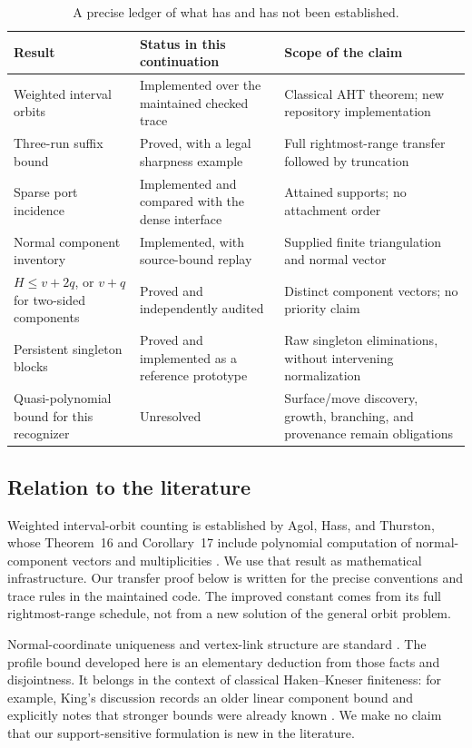 \documentclass[11pt,a4paper]{article}
\theoremstyle{definition}
\theoremstyle{remark}
\begin{document}
\begin{table}[htbp]
\centering\small
\begin{tabularx}{\textwidth}{@{}>{\raggedright\arraybackslash}p{}YY@{}}
\toprule
Result & Status in this continuation & Scope of the claim\\
\midrule
Weighted interval orbits & Implemented over the maintained checked trace &
Classical AHT theorem; new repository implementation\\
Three-run suffix bound & Proved, with a legal sharpness example &
Full rightmost-range transfer followed by truncation\\
Sparse port incidence & Implemented and compared with the dense interface &
Attained supports; no attachment order\\
Normal component inventory & Implemented, with source-bound replay &
Supplied finite triangulation and normal vector\\
$H\le v+2q$, or $v+q$ for two-sided components & Proved and independently audited &
Distinct component vectors; no priority claim\\
Persistent singleton blocks & Proved and implemented as a reference prototype &
Raw singleton eliminations, without intervening normalization\\
Quasi-polynomial bound for this recognizer & Unresolved &
Surface/move discovery, growth, branching, and provenance remain obligations\\
\bottomrule
\end{tabularx}
\caption{A precise ledger of what has and has not been established.}
\label{tab:status}
\end{table}

\subsection{Relation to the literature}

Weighted interval-orbit counting is established by Agol, Hass, and
Thurston, whose Theorem~16 and Corollary~17 include polynomial computation
of normal-component vectors and multiplicities \cite{aht2006}. We use that
result as mathematical infrastructure. Our transfer proof below is written
for the precise conventions and trace rules in the maintained code. The
improved constant comes from its full rightmost-range schedule, not from a
new solution of the general orbit problem.

Normal-coordinate uniqueness and vertex-link structure are standard
\cite{burton2009}. The profile bound developed here is an elementary
deduction from those facts and disjointness. It belongs in the context of
classical Haken--Kneser finiteness: for example, King's discussion records
an older linear component bound and explicitly notes that stronger bounds
were already known \cite{king2003}. We make no claim that our support-sensitive
formulation is new in the literature.
\end{document}
